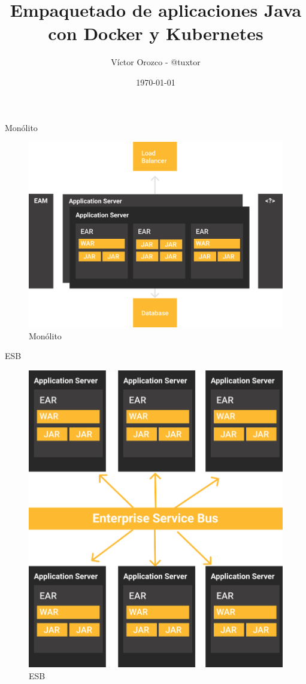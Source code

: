 \documentclass[aspectratio=169]{beamer}
\title{Empaquetado de aplicaciones Java con Docker y Kubernetes}
\author{Víctor Orozco - @tuxtor}
\institute{Academik}
\date{\today}
\begin{document}
{
    \frame{\titlepage}
}

    

\begin{frame}{Monólito}
    \begin{figure}
        \centering
        \includegraphics[width=0.6\linewidth]{Images/monolitos}
        \caption{Monólito}
    \end{figure}
\end{frame}

\begin{frame}{ESB}
    \begin{figure}
        \centering
        \includegraphics[width=0.4\linewidth]{Images/esb}
        \caption{ESB}
    \end{figure}
\end{frame}
\end{document}
